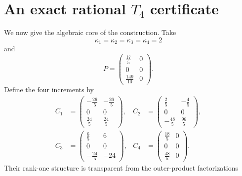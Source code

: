 \documentclass[11pt,reqno]{amsart}
\theoremstyle{definition}
\begin{document}
\section{An exact rational \texorpdfstring{$T_4$}{T4} certificate}
\label{sec:algebraic-T4}

We now give the algebraic core of the construction.  Take
\begin{equation}
  \kappa_1=\kappa_2=\kappa_3=\kappa_4=2
  \label{eq:kappas}
\end{equation}
and
\begin{equation}
  P=
  \begin{pmatrix}
    \frac{17}{5}&0\\
    0&0\\
    \frac{149}{10}&0
  \end{pmatrix}.
  \label{eq:P}
\end{equation}
Define the four increments by
\begin{align}
  C_1&=
  \begin{pmatrix}
    -\frac{26}{5}&-\frac{26}{5}\\
    0&0\\
    \frac{24}{5}&\frac{24}{5}
  \end{pmatrix},
  &
  C_2&=
  \begin{pmatrix}
    \frac25&-\frac45\\
    0&0\\
    -\frac{48}{5}&\frac{96}{5}
  \end{pmatrix},
  \label{eq:C12}\\[1ex]
  C_3&=
  \begin{pmatrix}
    \frac65&6\\
    0&0\\
    -\frac{24}{5}&-24
  \end{pmatrix},
  &
  C_4&=
  \begin{pmatrix}
    \frac{18}{5}&0\\
    0&0\\
    \frac{48}{5}&0
  \end{pmatrix}.
  \label{eq:C34}
\end{align}
Their rank-one structure is transparent from the outer-product
factorizations
\end{document}
